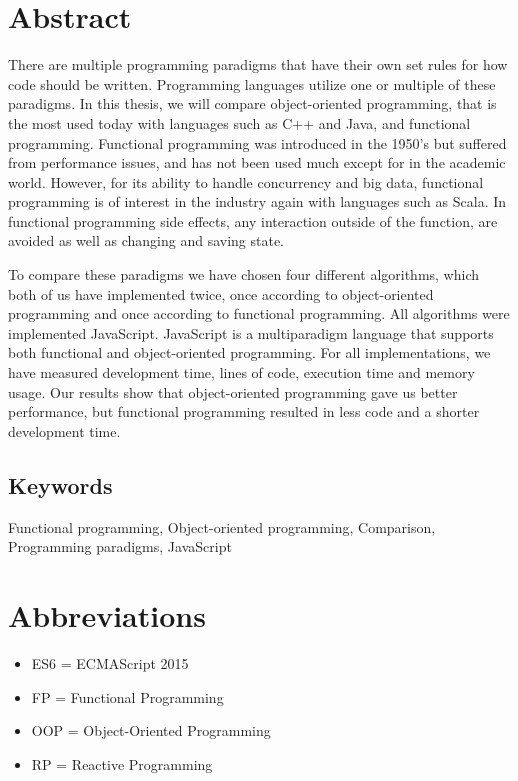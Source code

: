\documentclass {article}
\begin{document}
\section*{Abstract}
There are multiple programming paradigms that have their own set rules for how code should be written. Programming languages utilize one or multiple of these paradigms. In this thesis, we will compare object-oriented programming, that is the most used today with languages such as C++ and Java, and functional programming. Functional programming was introduced in the 1950's but suffered from performance issues, and has not been used much except for in the academic world. However, for its ability to handle concurrency and big data, functional programming is of interest in the industry again with languages such as Scala. In functional programming side effects, any interaction outside of the function, are avoided as well as changing and saving state. 
 
To compare these paradigms we have chosen four different algorithms, which both of us have implemented twice, once according to object-oriented programming and once according to functional programming. All algorithms were implemented JavaScript. JavaScript is a multiparadigm language that supports both functional and object-oriented programming. For all implementations, we have measured development time, lines of code, execution time and memory usage. Our results show that object-oriented programming gave us better performance, but functional programming resulted in less code and a shorter development time. 
\subsection*{Keywords}
Functional programming, Object-oriented programming, Comparison, Programming paradigms, JavaScript
 
\newpage
\tableofcontents
\newpage
{}
\newpage
 

\section*{Abbreviations}
\begin{itemize}[leftmargin=*]
\item [ ] ES6 = ECMAScript 2015
\item [ ] FP = Functional Programming
\item [ ] OOP = Object-Oriented Programming
\item [ ] RP = Reactive Programming
\end{itemize}
 
\end{document}
